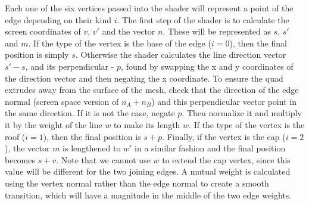 \documentclass[a4paper,10pt]{article}
\begin{document}
Each one of the six vertices passed into the shader will represent a point of the edge depending on their kind $i$. The first step of the shader is to calculate the screen coordinates of  $v$, $v'$ and the vector $n$. These will be represented as $s$, $s'$ and $m$. If the type of the vertex is the base of the edge ($i=0$), then the final position is simply $s$. Otherwise the shader calculates the line direction vector $s'-s$, and its perpendicular - $p$, found by swapping the x and y coordinates of the direction vector and then negating the x coordinate. To ensure the quad extrudes away from the surface of the mesh, check that the direction of the edge normal (screen space version of $n_A+n_B$) and this perpendicular vector point in the same direction. If it is not the case, negate $p$. Then normalize it and multiply it by the weight of the line $w$ to make its length $w$. If the type of the vertex is the roof ($i=1$), then the final position is $s+p$. Finally, if the vertex is the cap ($i=2$), the vector $m$ is lengthened to $w'$ in a similar fashion and the final position becomes $s+v$. Note that we cannot use $w$ to extend the cap vertex, since this value will be different for the two joining edges. A mutual weight is calculated using the vertex normal rather than the edge normal to create a smooth transition, which will have a magnitude in the middle of the two edge weights.
\end{document}
